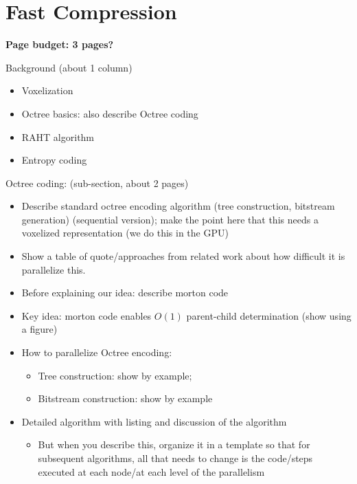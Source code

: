 \section{Fast Compression}\label{sec:fast-compression}

\textbf{Page budget: 3 pages?}

\begin{outline}

  Background (about 1 column)
  \begin{itemize}
  \item Voxelization \status{[Done]}
  \item Octree basics: also describe Octree coding \status{[Done]}
  \item RAHT algorithm \status{[Done]}
  \item Entropy coding \status{[Done]}
  \end{itemize}


  Octree coding: (sub-section, about 2 pages) \status{[Done]}
  \begin{itemize}
  \item Describe standard octree encoding algorithm (tree construction, bitstream generation) (sequential version); make the point here that this needs a voxelized representation (we do this in the GPU) \status{[Done]}
  \item Show a table of quote/approaches from related work about how difficult it is parallelize this. \status{[Done]}
  \item Before explaining our idea: describe morton code \status{[Done]}
  \item Key idea: morton code enables $O(1)$ parent-child determination (show using a figure) \status{[Done]}
  \item How to parallelize Octree encoding: \status{[Done]}
    \begin{itemize}
    \item Tree construction: show by example; \status{[Done]}
    \item Bitstream construction: show by example \status{[Done]}
    \end{itemize}
  \item Detailed algorithm with listing and discussion of the algorithm \status{[Done]}
    \begin{itemize}
    \item But when you describe this, organize it in a template so that for subsequent algorithms, all that needs to change is the code/steps executed at each node/at each level of the parallelism \status{[Done]}
    \end{itemize}
  \end{itemize}


\end{outline}
